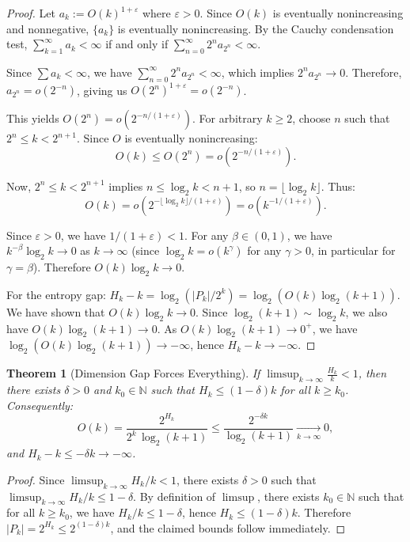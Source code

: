\documentclass[11pt]{article}
\newtheorem{theorem}{Theorem}
\theoremstyle{definition}
\newcommand{\bbN}{\mathbb{N}}
\newcommand{\eps}{\varepsilon}
\begin{document}
\begin{proof}
Let $a_k:=O(k)^{1+\eps}$ where $\eps > 0$. Since $O(k)$ is eventually nonincreasing and nonnegative, $\{a_k\}$ is eventually nonincreasing. By the Cauchy condensation test, $\sum_{k=1}^\infty a_k < \infty$ if and only if $\sum_{n=0}^\infty 2^n a_{2^n} < \infty$.

Since $\sum a_k < \infty$, we have $\sum_{n=0}^\infty 2^n a_{2^n} < \infty$, which implies $2^n a_{2^n} \to 0$. Therefore, $a_{2^n} = o(2^{-n})$, giving us $O(2^n)^{1+\eps} = o(2^{-n})$.

This yields $O(2^n) = o(2^{-n/(1+\eps)})$. For arbitrary $k \geq 2$, choose $n$ such that $2^n \leq k < 2^{n+1}$. Since $O$ is eventually nonincreasing:
$$O(k) \leq O(2^n) = o(2^{-n/(1+\eps)}).$$

Now, $2^n \leq k < 2^{n+1}$ implies $n \leq \log_2 k < n+1$, so $n = \lfloor \log_2 k \rfloor$. Thus:
$$O(k) = o\left(2^{-\lfloor \log_2 k \rfloor/(1+\eps)}\right) = o\left(k^{-1/(1+\eps)}\right).$$

Since $\eps > 0$, we have $1/(1+\eps) < 1$. For any $\beta \in (0,1)$, we have $k^{-\beta} \log_2 k \to 0$ as $k \to \infty$ (since $\log_2 k = o(k^\gamma)$ for any $\gamma > 0$, in particular for $\gamma = \beta$). Therefore $O(k)\log_2 k \to 0$.

For the entropy gap: $H_k - k = \log_2(|P_k|/2^k) = \log_2(O(k)\log_2(k+1))$. We have shown that $O(k)\log_2 k \to 0$. Since $\log_2(k+1) \sim \log_2 k$, we also have $O(k)\log_2(k+1) \to 0$. As $O(k)\log_2(k+1) \to 0^+$, we have $\log_2(O(k)\log_2(k+1)) \to -\infty$, hence $H_k - k \to -\infty$.
\end{proof}

\begin{theorem}[Dimension Gap Forces Everything]\label{thm:dimension-gap}
If $\displaystyle \limsup_{k\to\infty}\frac{H_k}{k}<1$, then there exists $\delta>0$ and $k_0 \in \bbN$ such that $H_k\le (1-\delta)k$ for all $k\ge k_0$. Consequently:
\begin{equation}
O(k)=\frac{2^{H_k}}{2^k\,\log_2(k+1)}\le\frac{2^{-\delta k}}{\log_2(k+1)}\xrightarrow[k\to\infty]{}0,
\end{equation}
and $H_k-k\le -\delta k\to -\infty$.
\end{theorem}

\begin{proof}
Since $\limsup_{k\to\infty} H_k/k < 1$, there exists $\delta > 0$ such that $\limsup_{k\to\infty} H_k/k \le 1-\delta$. By definition of $\limsup$, there exists $k_0 \in \bbN$ such that for all $k \ge k_0$, we have $H_k/k \le 1-\delta$, hence $H_k \le (1-\delta)k$. Therefore $|P_k|=2^{H_k}\le 2^{(1-\delta)k}$, and the claimed bounds follow immediately.
\end{proof}
\end{document}
